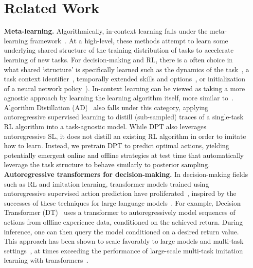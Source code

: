 \documentclass{article}
\newcommand{\macroName}{DPT}
\begin{document}
\section{Related Work}
\textbf{Meta-learning.}
Algorithmically, in-context learning falls under the meta-learning framework~\citep{schaul2010metalearning,bengio1990learning}.
At a high-level, these methods attempt to learn some underlying shared structure of the training distribution of tasks
to accelerate learning of new tasks.
For decision-making and RL, there is a often choice in what shared `structure' is specifically learned such as the dynamics of the task~\citep{fu2016one,nagabandi2018learning,landolfi2019model}, a task context identifier~\citep{rakelly2019efficient,humplik2019meta,zintgraf2019varibad,liu2021decoupling}, temporally extended skills and options~\citep{perkins1999using,gupta2018meta,jiang2022learning}, or initialization of a
neural network policy~\citep{finn2017model,rothfuss2018promp}). In-context learning can be viewed as taking a more agnostic approach by learning the learning algorithm itself, more similar to~\cite{duan2016rl,wang2016learning,mishra2017simple}.
Algorithm Distillation (AD)~\citep{laskin2022context,lu2023structured} also falls under this category, applying autoregressive supervised learning to distill (sub-sampled) traces of a single-task RL algorithm into a task-agnostic model.
While \macroName{} also leverages autoregressive SL, it does not distill an existing RL algorithm in order to imitate how to learn. Instead, we pretrain DPT to predict optimal actions, yielding potentially emergent online and offline strategies at test time that automatically leverage the task structure to behave similarly to posterior sampling.
\textbf{Autoregressive transformers for decision-making.}
In decision-making fields such as RL and imitation learning, transformer models trained using autoregressive supervised action prediction have proliferated~\citep{yang2023foundation}, inspired by the successes of these techniques for large language models~\citep{vaswani2017attention,raffel2020exploring,brown2020language}.
For example, Decision Transformer (DT)~\citep{chen2021decision,janner2021offline} uses a transformer to autoregressively model sequences of actions from offline experience data, conditioned on the achieved return. During inference, one can then query the model conditioned on a desired return value.
This approach has been shown to scale favorably to large models and multi-task settings~\citep{lee2022multi}, at times exceeding the performance of large-scale multi-task imitation learning with transformers~\citep{reed2022generalist,brohan2022rt,shafiullah2022behavior}.
\end{document}

